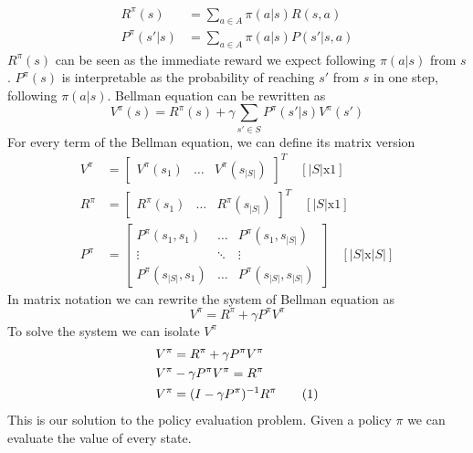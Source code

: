\documentclass[main.tex]{subfiles}
\newcommand\numberthis{\addtocounter{equation}{1}\tag{\theequation}}
\begin{document}
\begin{align*}
    R^{\pi}(s) &= \sum_{a\in A} \pi(a|s)R(s,a) \\
    P^{\pi}(s'|s) &= \sum_{a\in A} \pi(a|s)P(s'|s,a)
\end{align*}
$R^{\pi}(s)$ can be seen as the immediate reward we expect following $\pi(a|s)$ from $s$. $P^{\pi}(s)$ is interpretable as the probability of reaching $s'$ from $s$ in one step, following $\pi(a|s)$.
Bellman equation can be rewritten as
\begin{equation*}
    V^{\pi}(s) = R^{\pi}(s) + \gamma \sum_{s' \in S} P^{\pi}(s'|s) V^{\pi}(s')
\end{equation*}
For every term of the Bellman equation, we can define its matrix version
\begin{align*}
    V^{\pi} &= \begin{bmatrix} V^{\pi}(s_1) & \dots & V^{\pi}(s_{|S|}) \end{bmatrix}^T \quad [|S|\text{x}1] \\
    R^{\pi} &= \begin{bmatrix} R^{\pi}(s_1) & \dots & R^{\pi}(s_{|S|}) \end{bmatrix}^T \quad [|S|\text{x}1] \\
    P^{\pi} &= \begin{bmatrix}
    P^{\pi}(s_1,s_1) & \dots & P^{\pi}(s_1,s_{|S|}) \\
    \vdots & \ddots & \vdots \\
    P^{\pi}(s_{|S|},s_1) & \dots & P^{\pi}(s_{|S|},s_{|S|})
    \end{bmatrix} \quad [|S|\text{x}|S|]
\end{align*}
In matrix notation we can rewrite the system of Bellman equation as
\begin{equation}
    V^{\pi} = R^{\pi} + \gamma P^{\pi} V^{\pi}
\end{equation}
To solve the system we can isolate $V^{\pi}$
\begin{align*}
    V^{\pi} &= R^{\pi} + \gamma P^{\pi} V^{\pi} \\
    V^{\pi} &- \gamma P^{\pi} V^{\pi} = R^{\pi} \\
    V^{\pi} &= (I - \gamma P^{\pi})^{-1} R^{\pi} \label{eqn_V-pi} \numberthis
\end{align*}
This is our solution to the policy evaluation problem. Given a policy $\pi$ we can evaluate the value of every state.
\end{document}

